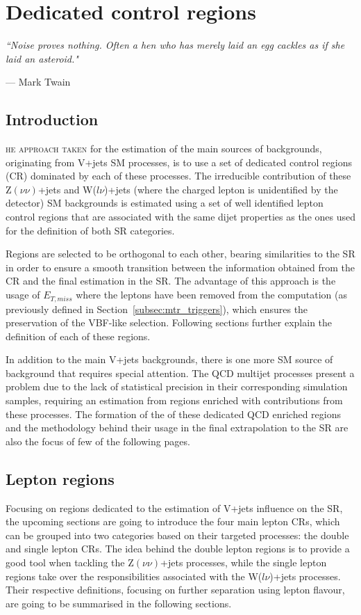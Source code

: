 \chapter{Dedicated control regions}
\label{ch:control_regions}
\epigraph{\itshape``Noise proves nothing. Often a hen who has merely laid an egg cackles as if she laid an asteroid."}{--- \textup{Mark Twain}}

\section{Introduction}
\hspace{10pt}\lettrine[lines=2]{}{he approach taken} for the estimation of the main sources of backgrounds, originating from V+jets SM processes, is to use a set of dedicated control regions (CR) dominated by each of these processes. The irreducible contribution of these Z$(\nu\nu)$+jets and W($l\nu$)+jets (where the charged lepton is unidentified by the detector) SM backgrounds is estimated using a set of well identified lepton control regions that are associated with the same dijet properties as the ones used for the definition of both SR categories.

\hspace{10pt} Regions are selected to be orthogonal to each other, bearing similarities to the SR in order to ensure a smooth transition between the information obtained from the CR and the final estimation in the SR. The advantage of this approach is the usage of $E_{T, miss}$ where the leptons have been removed from the computation (as previously defined in Section~\ref{subsec:mtr_triggers}), which ensures the preservation of the VBF-like selection. Following sections further explain the definition of each of these regions.

\hspace{10pt} In addition to the main V+jets backgrounds, there is one more SM source of background that requires special attention. The QCD multijet processes present a problem due to the lack of statistical precision in their corresponding simulation samples, requiring an estimation from regions enriched with contributions from these processes. The formation of the of these dedicated QCD enriched regions and the methodology behind their usage in the final extrapolation to the SR are also the focus of few of the following pages.

\section{Lepton regions}
\hspace{10pt} Focusing on regions dedicated to the estimation of V+jets influence on the SR, the upcoming sections are going to introduce the four main lepton CRs, which can be grouped into two categories based on their targeted processes: the double and single lepton CRs. The idea behind the double lepton regions is to provide a good tool when tackling the Z$(\nu\nu)$+jets processes, while the single lepton regions take over the responsibilities associated with the W($l\nu$)+jets processes. Their respective definitions, focusing on further separation using lepton flavour, are going to be summarised in the following sections.

